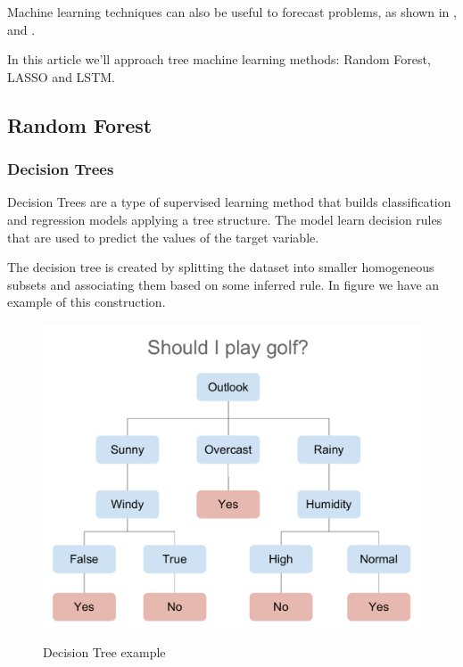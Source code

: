 \documentclass[12pt]{report}
\begin{document}
Machine learning techniques can also be useful to forecast problems, as shown in \citet{shen2012stock}, \citet{santillana2015combining} and \citet{bai2005prediction}. 


In this article we'll approach tree machine learning methods: Random Forest, LASSO and LSTM.

\subsection{Random Forest}

\subsubsection{Decision Trees}

Decision Trees are a type of supervised learning method that builds classification and regression models applying a tree structure. The model learn decision rules that are used to predict the values of the target variable.

The decision tree is created by splitting the dataset into smaller homogeneous subsets and associating them based on some inferred rule. In figure we have an example of this construction.

\begin{figure}
\centering
\includegraphics[width=\textwidth/2]{decision_tree.pdf}
\label{fig:decision_tree}
\caption{Decision Tree example}
\end{figure}
\end{document}
